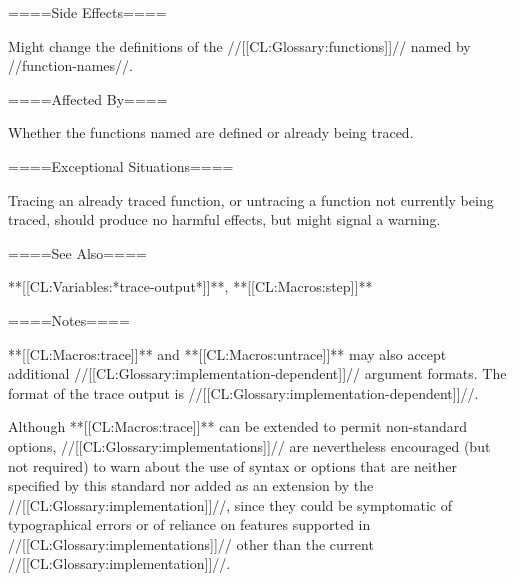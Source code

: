 ====Side Effects====

Might change the definitions of the //[[CL:Glossary:functions]]// named by //function-names//.

====Affected By====

Whether the functions named are defined or already being traced.

====Exceptional Situations====

Tracing an already traced function, or untracing a function not currently being traced, should produce no harmful effects, but might signal a warning.

====See Also====

**[[CL:Variables:*trace-output*]]**, **[[CL:Macros:step]]**

====Notes====

**[[CL:Macros:trace]]** and **[[CL:Macros:untrace]]** may also accept additional //[[CL:Glossary:implementation-dependent]]// argument formats. The format of the trace output is //[[CL:Glossary:implementation-dependent]]//.

Although **[[CL:Macros:trace]]** can be extended to permit non-standard options, //[[CL:Glossary:implementations]]// are nevertheless encouraged (but not required) to warn about the use of syntax or options that are neither specified by this standard nor added as an extension by the //[[CL:Glossary:implementation]]//, since they could be symptomatic of typographical errors or of reliance on features supported in //[[CL:Glossary:implementations]]// other than the current //[[CL:Glossary:implementation]]//.


